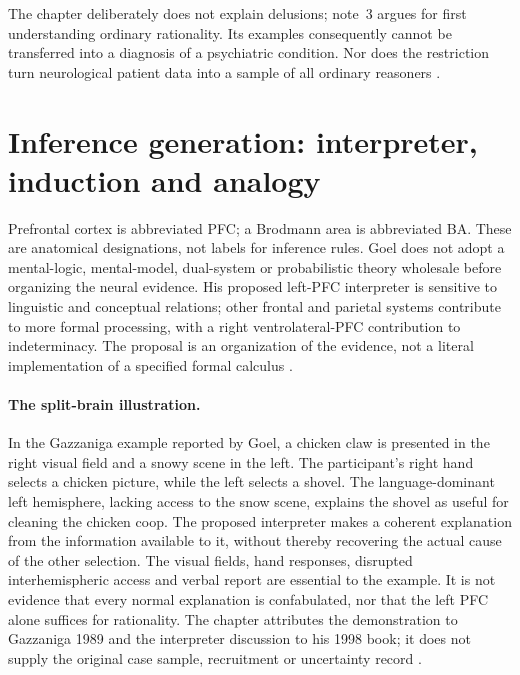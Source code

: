 The chapter deliberately does not explain delusions; note~3 argues for
first understanding ordinary rationality. Its examples consequently cannot
be transferred into a diagnosis of a psychiatric condition. Nor does the
restriction turn neurological patient data into a sample of all ordinary
reasoners \cite[p.~124, note~3]{Goel2021RationalityBrain}.

\section{Inference generation: interpreter, induction and analogy}
\label{sec:p19-r14-generation}

Prefrontal cortex is abbreviated PFC; a Brodmann area is abbreviated BA.
These are anatomical designations, not labels for inference rules. Goel
does not adopt a mental-logic, mental-model, dual-system or probabilistic
theory wholesale before organizing the neural evidence. His proposed
left-PFC interpreter is sensitive to linguistic and conceptual relations;
other frontal and parietal systems contribute to more formal processing,
with a right ventrolateral-PFC contribution to indeterminacy. The proposal
is an organization of the evidence, not a literal implementation of a
specified formal calculus \cite[pp.~117--118]{Goel2021RationalityBrain}.

\paragraph{The split-brain illustration.}
In the Gazzaniga example reported by Goel, a chicken claw is presented in
the right visual field and a snowy scene in the left. The participant's
right hand selects a chicken picture, while the left selects a shovel.
The language-dominant left hemisphere, lacking access to the snow scene,
explains the shovel as useful for cleaning the chicken coop. The proposed
interpreter makes a coherent explanation from the information available
to it, without thereby recovering the actual cause of the other selection.
The visual fields, hand responses, disrupted interhemispheric access and
verbal report are essential to the example. It is not evidence that every
normal explanation is confabulated, nor that the left PFC alone suffices
for rationality. The chapter attributes the demonstration to Gazzaniga
1989 and the interpreter discussion to his 1998 book; it does not supply
the original case sample, recruitment or uncertainty record
\cite[p.~117]{Goel2021RationalityBrain}.

